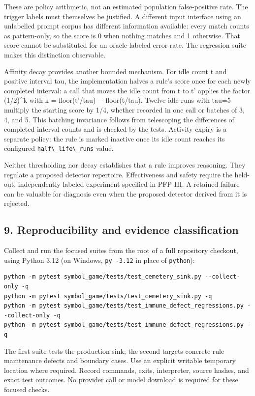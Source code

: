 \documentclass[
  11pt,
]{article}
\newcommand{\passthrough}[1]{#1}
\begin{document}
These are policy arithmetic, not an estimated population false-positive
rate. The trigger labels must themselves be justified. A different input
interface using an unlabelled prompt corpus has different information
available: every match counts as pattern-only, so the score is 0 when
nothing matches and 1 otherwise. That score cannot be substituted for an
oracle-labeled error rate. The regression suite makes this distinction
observable.

Affinity decay provides another bounded mechanism. For idle count t and
positive interval tau, the implementation halves a rule's score once for
each newly completed interval: a call that moves the idle count from t
to t' applies the factor (1/2)\^{}k with k = floor(t'/tau) −
floor(t/tau). Twelve idle runs with tau=5 multiply the starting score by
1/4, whether recorded in one call or batches of 3, 4, and 5. This
batching invariance follows from telescoping the differences of
completed interval counts and is checked by the tests. Activity expiry
is a separate policy: the rule is marked inactive once its idle count
reaches its configured \passthrough{\lstinline!half\_life\_runs!} value.

Neither thresholding nor decay establishes that a rule improves
reasoning. They regulate a proposed detector repertoire. Effectiveness
and safety require the held-out, independently labeled experiment
specified in PFP III. A retained failure can be valuable for diagnosis
even when the proposed detector derived from it is rejected.

\subsection{9. Reproducibility and evidence
classification}\label{reproducibility-and-evidence-classification}

Collect and run the focused suites from the root of a full repository
checkout, using Python 3.12 (on Windows,
\passthrough{\lstinline!py -3.12!} in place of
\passthrough{\lstinline!python!}):

\begin{lstlisting}
python -m pytest symbol_game/tests/test_cemetery_sink.py --collect-only -q
python -m pytest symbol_game/tests/test_cemetery_sink.py -q
python -m pytest symbol_game/tests/test_immune_defect_regressions.py --collect-only -q
python -m pytest symbol_game/tests/test_immune_defect_regressions.py -q
\end{lstlisting}

The first suite tests the production sink; the second targets concrete
rule maintenance defects and boundary cases. Use an explicit writable
temporary location where required. Record commands, exits, interpreter,
source hashes, and exact test outcomes. No provider call or model
download is required for these focused checks.
\end{document}
